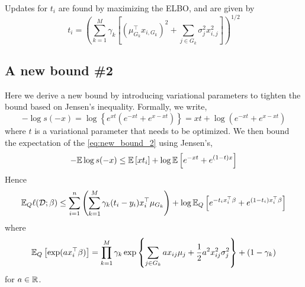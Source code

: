 Updates for $t_i$ are found by maximizing the ELBO, and are given by
\begin{equation}
    t_i = \left( 
	\sum_{k=1}^M \gamma_k \left[
	    (\mu_{G_k}^\top x_{i, G_k})^2 + \sum_{j \in G_k} \sigma_{j}^2 x_{i, j}^2
	\right]
    \right)^{1/2}
\end{equation}


\subsection{A new bound \#2}

Here we derive a new bound by introducing variational parameters to tighten the bound based on Jensen's inequality. Formally, we write,
\begin{equation} \label{eq:new_bound_2}
    -\log s(-x) 
    = \log \left\{ e^{x t} \left( e^{-x t} + e^{x - x t} \right) \right\}
    = x t + \log \left( e^{-x t} + e^{x - x t} \right)
\end{equation}
where $t$ is a variational parameter that needs to be optimized. We then bound the expectation of the \eqref{eq:new_bound_2} using Jensen's,
\begin{equation}
    -\mathbb{E} \log s(-x)
    \leq
    \mathbb{E} \left[ x t_i \right] + \log \mathbb{E} \left[ e^{-x t} + e^{(1-t)x} \right]
\end{equation}
Hence
\begin{equation}
    \mathbb{E}_Q \ell (\mathcal{D}; \beta) 
    \leq 
    \sum_{i=1}^n 
    \left( \sum_{k=1}^M \gamma_k (t_i - y_i) x^\top_i \mu_{G_k} \right)
    +
    \log \mathbb{E}_Q \left[ e^{-t_i x_i^\top \beta} + e^{(1-t_i)x_i^\top \beta} \right]
\end{equation}
where
\begin{equation*}
    \mathbb{E}_Q \left[ \exp(a x_i^\top \beta) \right]
    =	
	\prod_{k=1}^M \gamma_k \exp \left\{ 
	    \sum_{j \in G_k} 
	    a x_{ij} \mu_{j}
	    + 
	    \frac{1}{2} a^2 x_{ij}^2 \sigma_{j}^2
	\right\}
	+
	(1- \gamma_k)
\end{equation*}
for $a \in \mathbb{R}$.


